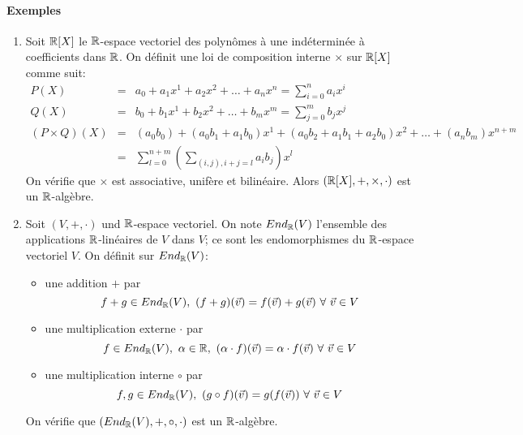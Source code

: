 \paragraph{Exemples}
\begin{enumerate}[1)]
  \item Soit $\mathbb{R}[X]$ le $\mathbb{R}$-espace vectoriel des polynômes à une indéterminée à  coefficients dans $\mathbb{R}$. On définit une loi de composition interne $\times$ sur $\mathbb{R}[X]$ comme suit:
    \begin{eqnarray*}
      P(X) &=& a_0 + a_1 x^1 + a_2 x^2 + \ldots + a_n x^n = \sum_{i=0}^{n} a_i x^i \\
      Q(X) &=& b_0 + b_1 x^1 + b_2 x^2 + \ldots + b_m x^m = \sum_{j=0}^{m} b_j x^j \\
      (P \times Q)(X) &=& (a_0 b_0) + (a_0 b_1 + a_1 b_0) x^1 + (a_0 b_2 + a_1 b_1 + a_2 b_0) x^2 + \ldots + (a_n b_m) x^{n+m} \\
        &=& \sum_{l=0}^{n+m} \left ( \sum_{(i, j), i+j=l} a_i b_j \right ) x^l
    \end{eqnarray*}
    On vérifie que $\times$ est associative, unifère et bilinéaire. Alors $(\mathbb{R}[X], + , \times, \cdot)$ est un $\mathbb{R}$-algèbre.
    
  \item Soit $(V, +, \cdot)$ und $\mathbb{R}$-espace vectoriel. On note $End_{\mathbb{R}}(V)$ l'ensemble des applications $\mathbb{R}$-linéaires de $V$ dans $V$; ce sont les endomorphismes du $\mathbb{R}$-espace vectoriel $V$. On définit sur $End_{\mathbb{R}}(V)$:
    \begin{itemize}
      \item une addition $+$ par
        $$f+g \in End_{\mathbb{R}}(V), ~ (f+g)(\vec{v}) = f(\vec{v}) + g(\vec{v}) ~ \forall ~ \vec{v} \in V$$
      \item une multiplication externe $\cdot$ par
        $$f \in End_{\mathbb{R}}(V), ~ \alpha \in \mathbb{R}, ~ (\alpha \cdot f)(\vec{v}) = \alpha \cdot f(\vec{v}) ~ \forall ~ \vec{v} \in V$$
      \item une multiplication interne $\circ$ par
        $$f, g \in End_{\mathbb{R}}(V), ~ (g \circ f)(\vec{v}) = g(f(\vec{v})) ~ \forall ~ \vec{v} \in V$$
    \end{itemize} 
    On vérifie que $(End_{\mathbb{R}}(V), +, \circ, \cdot)$ est un $\mathbb{R}$-algèbre.
\end{enumerate}
